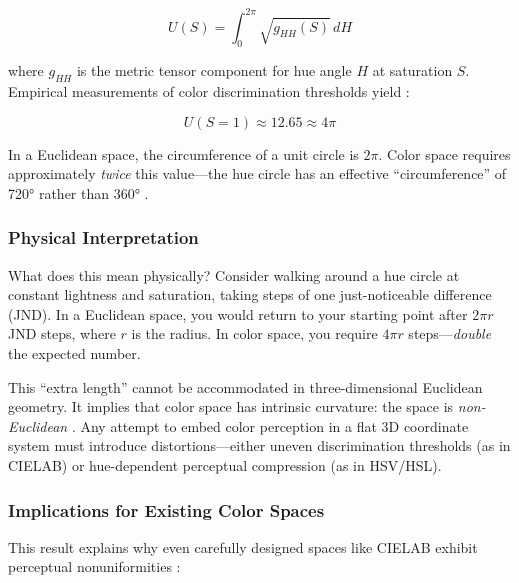 \begin{equation}
    U(S) = \int_{0}^{2\pi} \sqrt{g_{HH}(S)} \, dH
    \label{eq:hue-circumference}
\end{equation}

\noindent where $g_{HH}$ is the metric tensor component for hue angle $H$ at saturation $S$. Empirical measurements of color discrimination thresholds yield \citep{nolle2012}:

\begin{equation}
    U(S=1) \approx 12.65 \approx 4\pi
    \label{eq:720-result}
\end{equation}

In a Euclidean space, the circumference of a unit circle is $2\pi$. Color space requires approximately \emph{twice} this value—the hue circle has an effective ``circumference'' of 720° rather than 360° \citep{nolle2012}.

\subsubsection{Physical Interpretation}

What does this mean physically? Consider walking around a hue circle at constant lightness and saturation, taking steps of one just-noticeable difference (JND). In a Euclidean space, you would return to your starting point after $2\pi r$ JND steps, where $r$ is the radius. In color space, you require $4\pi r$ steps—\emph{double} the expected number.

This ``extra length'' cannot be accommodated in three-dimensional Euclidean geometry. It implies that color space has intrinsic curvature: the space is \emph{non-Euclidean} \citep{nolle2012,roberti2023}. Any attempt to embed color perception in a flat 3D coordinate system must introduce distortions—either uneven discrimination thresholds (as in CIELAB) or hue-dependent perceptual compression (as in HSV/HSL).

\subsubsection{Implications for Existing Color Spaces}

This result explains why even carefully designed spaces like CIELAB exhibit perceptual nonuniformities \citep{kong2021}:

